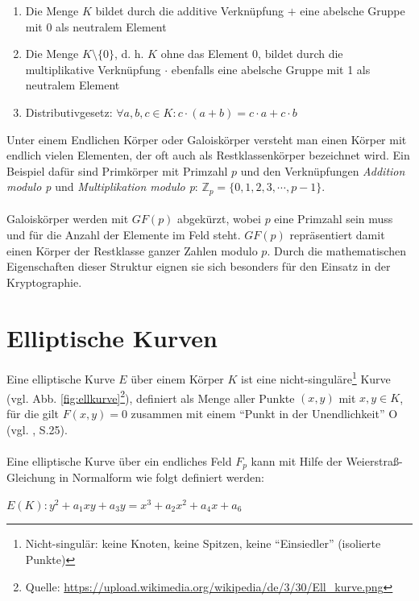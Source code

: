 \begin{enumerate}
  \item Die Menge $K$ bildet durch die additive Verknüpfung $+$ eine abelsche Gruppe
mit 0 als neutralem Element
  \item Die Menge $K\setminus\{0\}$, d. h. $K$ ohne das Element 0, bildet durch die multiplikative Verknüpfung $\cdot$ ebenfalls eine abelsche Gruppe mit 1 als neutralem Element
  \item Distributivgesetz: $ \forall a,b,c \in K: c \cdot (a + b) = c \cdot a + c \cdot b $ \\
\end{enumerate}

Unter einem Endlichen Körper oder Galoiskörper versteht man einen Körper mit endlich vielen Elementen, der oft auch als Restklassenkörper bezeichnet wird. Ein Beispiel dafür sind Primkörper mit Primzahl $p$ und den Verknüpfungen \textit{Addition modulo p} und \textit{Multiplikation modulo p}: $\mathbb{Z}_p = \{0,1,2,3,\cdots,p-1\}$. 
\\ \\
Galoiskörper werden mit $GF(p)$ abgekürzt, wobei $p$ eine Primzahl sein muss und für die Anzahl der Elemente im Feld steht. $GF(p)$ repräsentiert damit einen Körper der Restklasse ganzer Zahlen modulo $p$. Durch die mathematischen Eigenschaften dieser Struktur eignen sie sich besonders für den Einsatz in der Kryptographie.

\section{Elliptische Kurven} 
\label{sec:ell}

Eine elliptische Kurve $E$ über einem Körper $K$ ist eine nicht-singuläre\footnote{Nicht-singulär: keine Knoten, keine Spitzen, keine ``Einsiedler'' (isolierte Punkte)} Kurve (vgl. Abb. \ref{fig:ellkurve}\footnote{Quelle: \url{https://upload.wikimedia.org/wikipedia/de/3/30/Ell\_kurve.png}}), definiert als Menge aller Punkte $(x,y)$ mit $x,y \in K$, für die gilt $F(x,y)=0$ zusammen mit einem ``Punkt in der Unendlichkeit'' O (vgl. \cite{grebe}, S.25).
\\ \\
Eine elliptische Kurve über ein endliches Feld $F_p$ kann mit Hilfe der Weierstraß-Gleichung in Normalform wie folgt definiert werden:

\begin{center}
$E(K): y^2 + a_1 x y + a_3 y = x^3 + a_2 x^2 + a_4 x + a_6 $
\end{center}


